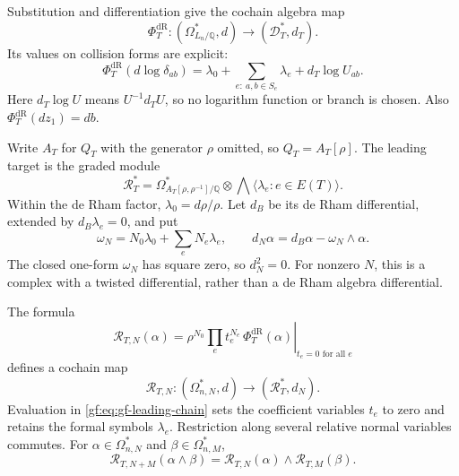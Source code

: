 Substitution and differentiation give the cochain algebra map
\begin{equation}\label{gf:eq:gf-dr-map}
 \Phi_T^{\mathrm{dR}}:
 (\Omega^*_{L_n/\mathbb Q},d)
 \longrightarrow(\mathscr D_T^*,d_T).
\end{equation}
Its values on collision forms are explicit:
\begin{equation}\label{gf:eq:gf-dlog}
 \Phi_T^{\mathrm{dR}}(d\log\delta_{ab})=
 \lambda_0+\sum_{e:\ a,b\in S_e}\lambda_e+d_T\log U_{ab}.
\end{equation}
Here \(d_T\log U\) means \(U^{-1}d_TU\), so no logarithm
function or branch is chosen.
Also \(\Phi_T^{\mathrm{dR}}(dz_1)=db\).

Write \(A_T\) for \(Q_T\) with the generator \(\rho\) omitted,
so \(Q_T=A_T[\rho]\).  The leading target is the graded module
\[
 \mathscr R_T^*=\Omega^*_{A_T[\rho,\rho^{-1}]/\mathbb Q}
                    \otimes\bigwedge\langle\lambda_e:e\in E(T)\rangle.
\]
Within the de Rham factor, \(\lambda_0=d\rho/\rho\).
Let \(d_B\) be its de Rham differential, extended by
\(d_B\lambda_e=0\), and put
\[
 \omega_N=N_0\lambda_0+\sum_eN_e\lambda_e,
 \qquad d_N\alpha=d_B\alpha-\omega_N\wedge\alpha.
\]
The closed one-form \(\omega_N\) has square zero, so
\(d_N^2=0\).  For nonzero \(N\), this is a complex with a
twisted differential, rather than a de Rham algebra differential.

\begin{theorem}\label{gf:thm:gf-leading-chain}
The formula
\begin{equation}\label{gf:eq:gf-leading-chain}
 \mathcal R_{T,N}(\alpha)=
 \left.
 \rho^{N_0}\prod_et_e^{N_e}\,
 \Phi_T^{\mathrm{dR}}(\alpha)\right|_{t_e=0\text{ for all }e}
\end{equation}
defines a cochain map
\[
 \mathcal R_{T,N}:(\Omega^*_{n,N},d)
       \longrightarrow(\mathscr R_T^*,d_N).
\]
Evaluation in \eqref{gf:eq:gf-leading-chain} sets the coefficient
variables \(t_e\) to zero and retains the formal symbols \(\lambda_e\).
Restriction along several relative normal variables commutes.
For \(\alpha\in\Omega^*_{n,N}\) and
\(\beta\in\Omega^*_{n,M}\),
\[
 \mathcal R_{T,N+M}(\alpha\wedge\beta)
     =\mathcal R_{T,N}(\alpha)\wedge\mathcal R_{T,M}(\beta).
\]
\end{theorem}

